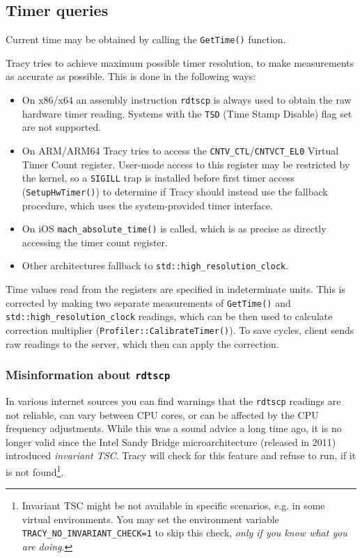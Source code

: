 \documentclass[hidelinks,titlepage,a4paper]{article}
\begin{document}
\subsection{Timer queries}
\label{timerqueries}

Current time may be obtained by calling the \texttt{GetTime()} function.

Tracy tries to achieve maximum possible timer resolution, to make measurements as accurate as possible. This is done in the following ways:

\begin{itemize}
\item On x86/x64 an assembly instruction \texttt{rdtscp} is always used to obtain the raw hardware timer reading. Systems with the \texttt{TSD} (Time Stamp Disable) flag set are not supported.
\item On ARM/ARM64 Tracy tries to access the \texttt{CNTV\_CTL}/\texttt{CNTVCT\_EL0} Virtual Timer Count register. User-mode access to this register may be restricted by the kernel, so a \texttt{SIGILL} trap is installed before first timer access (\texttt{SetupHwTimer()}) to determine if Tracy should instead use the fallback procedure, which uses the system-provided timer interface.
\item On iOS \texttt{mach\_absolute\_time()} is called, which is as precise as directly accessing the timer count register.
\item Other architectures fallback to \texttt{std::high\_resolution\_clock}.
\end{itemize}

Time values read from the registers are specified in indeterminate units. This is corrected by making two separate measurements of \texttt{GetTime()} and \texttt{std::high\_resolution\_clock} readings, which can be then used to calculate correction multiplier (\texttt{Profiler::CalibrateTimer()}). To save cycles, client sends raw readings to the server, which then can apply the correction.

\subsubsection{Misinformation about \texttt{rdtscp}}

In various internet sources you can find warnings that the \texttt{rdtscp} readings are not reliable, can vary between CPU cores, or can be affected by the CPU frequency adjustments. While this was a sound advice a long time ago, it is no longer valid since the Intel Sandy Bridge microarchitecture (released in 2011) introduced \emph{invariant TSC}. Tracy will check for this feature and refuse to run, if it is not found\footnote{Invariant TSC might be not available in specific scenarios, e.g. in some virtual environments. You may set the environment variable \texttt{TRACY\_NO\_INVARIANT\_CHECK=1} to skip this check, \emph{only if you know what you are doing}.}.
\end{document}
